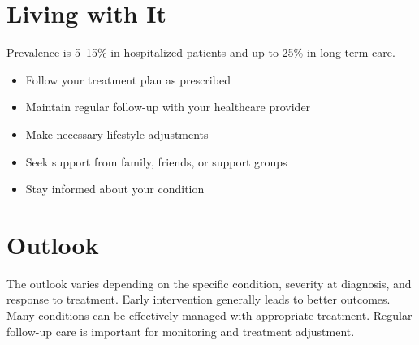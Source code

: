 \section{Living with It}
Prevalence is 5--15\% in hospitalized patients and up to 25\% in long-term care.

\begin{itemize}[noitemsep]
  \item Follow your treatment plan as prescribed
  \item Maintain regular follow-up with your healthcare provider
  \item Make necessary lifestyle adjustments
  \item Seek support from family, friends, or support groups
  \item Stay informed about your condition
\end{itemize}
\section{Outlook}
The outlook varies depending on the specific condition, severity at diagnosis, and response to treatment. Early intervention generally leads to better outcomes. Many conditions can be effectively managed with appropriate treatment. Regular follow-up care is important for monitoring and treatment adjustment.
